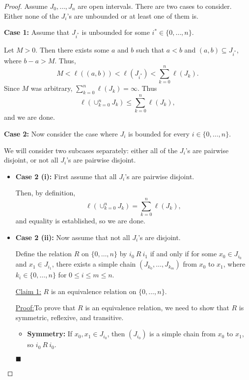 \documentclass[12pt]{article}
\newenvironment{claimproof}[1]{\par\noindent\underline{Proof:}\space#1}{\hfill $\blacksquare$}
\begin{document}
\begin{proof} 
Assume $J_{0}, \dots, J_{n}$ are open intervals. There are two cases to
consider. Either none of the $J_{i}$'s are unbounded or at least one of them is.

{\bf Case 1:} Assume that $J_{i^{*}}$ is unbounded for some $i^{*} \in \{0,\dots, n\}$.

Let $M > 0$. Then there exists some $a$ and $b$ such that $a < b$ and $(a,b)
\subseteq J_{i^{*}}$, where $b - a > M$. Thus,
\[ M < \ell\left( (a,b) \right) < \ell(J_{i^{*}}) < \sum_{k=0}^{n}\ell(J_{k}).
\]
Since $M$ was arbitrary, $\sum_{k=0}^{n}\ell(J_{k}) = \infty$. Thus 
\[ \ell\left( \cup_{k=0}^{n}J_{k} \right) \leq \sum_{k=0}^{n}\ell(J_{k}), \]
and we are done.

{\bf Case 2:} Now consider the case where $J_{i}$ is bounded for every $i \in \{0, \dots, n\}$.

We will consider two subcases separately: either all of the $J_{i}$'s are
pairwise disjoint, or not all $J_{i}$'s are pairwise disjoint.
\begin{itemize}[label={},leftmargin=8mm, itemsep=1em, parsep=1em]
\item {\bf Case 2 (i):} First assume that all $J_{i}$'s are pairwise disjoint.

Then, by definition, 
\[ \ell\left(\cup_{k=0}^{n}J_{k}\right) = \sum_{k=0}^{n}\ell(J_{k}), \]
and equality is established, so we are done.

\item {\bf Case 2 (ii):} Now assume that not all $J_{i}$'s are disjoint.

Define the relation $R$ on $\{0, \dots, n\}$ by $i_{0}\  R\  i_{1}$ if and only if
for some $x_{0} \in J_{i_{0}}$ and $x_{1} \in J_{i_{1}}$, there exists a simple
chain $(J_{k_{0}}, \dots, J_{k_{m}})$ from $x_{0}$ to $x_{1}$, where $k_{i} \in
\{0, \dots, n\}$ for $0\leq i \leq m \leq n$.

\underline{Claim 1:} $R$ is an equivalence relation on $\{0,\dots, n\}$.

\begin{claimproof}
To prove that $R$ is an equivalence relation, we need to show that $R$ is
symmetric, reflexive, and transitive.
\begin{itemize}[label={},leftmargin=4mm, itemsep=1em, parsep=1em]
\item {\bf Symmetry:} If $x_{0}, x_{1} \in J_{i_{0}}$, then $(J_{i_{0}})$ is a
simple chain from $x_{0}$ to $x_{1}$, so $i_{0}\ R\ i_{0}$.


\end{itemize}
\end{claimproof}
\end{itemize}
\end{proof}
\end{document}
